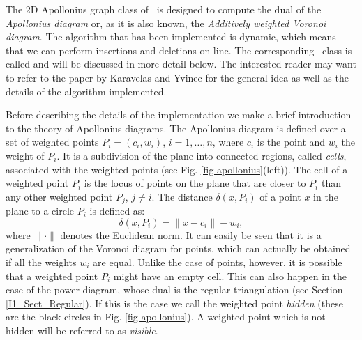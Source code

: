 The 2D Apollonius graph class of \cgal\ is designed to compute the
dual of the {\em Apollonius diagram} or, as it is also known, the
{\em Additively weighted Voronoi diagram}. The algorithm that has been
implemented is dynamic, which means that we can perform insertions and
deletions on line. The corresponding \cgal\ class is called
and will be discussed in
more detail below. The interested reader may want to refer to the
paper by Karavelas and Yvinec \cite{ky-dawvd-02} for the general idea
as well as the details of the algorithm implemented.


Before describing the details of the implementation we make a brief
introduction to the theory of Apollonius diagrams.
The Apollonius diagram is defined over a set of weighted points
$P_i=(c_i,w_i)$, $i=1,\ldots,n$, where $c_i$ is the point and $w_i$
the weight of $P_i$. It is a subdivision of the plane into connected
regions, called {\em cells}, associated with the weighted points (see
Fig. \ref{fig-apollonius}(left)). The cell of a 
weighted point $P_i$ is the locus of points on the plane that are
closer to $P_i$ than any other weighted point $P_j$, $j\neq i$.
The distance $\delta(x, P_i)$ of a point $x$ in the plane to a
circle $P_i$ is defined as: 
\[      \delta(x,P_i)=\|x-c_i\|-w_i,\]
where $\|\cdot\|$ denotes the Euclidean norm.
It can easily be seen that it is a generalization of the Voronoi
diagram for points, which can actually be obtained if all the weights
$w_i$ are equal. Unlike the case of points, however, it is
possible that a weighted point $P_i$ might have an empty cell. This
can also happen in the case of the power diagram, whose dual is the
regular triangulation (see Section \ref{I1_Sect_Regular}). If this is
the case we call the weighted point {\em hidden} (these are the black
circles in Fig. \ref{fig-apollonius}). A weighted point which is not
hidden will be referred to as {\em visible}.

